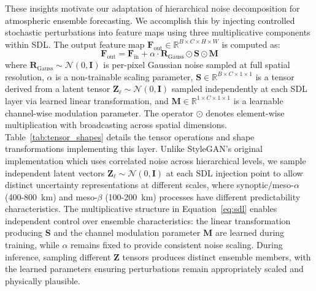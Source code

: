 \documentclass[11pt]{article}
\begin{document}
These insights motivate our adaptation of hierarchical noise decomposition for atmospheric ensemble forecasting. We accomplish this by injecting controlled stochastic perturbations into feature maps using three multiplicative components within SDL. The output feature map $\mathbf{F}_{\text{out}} \in \mathbb{R}^{B \times C \times H \times W}$ is computed as:
\begin{equation}
\mathbf{F}_{\text{out}} = \mathbf{F}_{\text{in}} + \alpha \cdot \mathbf{R}_{\text{Gauss}}  \odot \mathbf{S} \odot \mathbf{M}
\label{eq:sdl}
\end{equation}
where $\mathbf{R}_{\text{Gauss}} \sim \mathcal{N}(0, \mathbf{I})$ is per-pixel Gaussian noise sampled at full spatial resolution, $\alpha$ is a non-trainable scaling parameter, $\mathbf{S} \in \mathbb{R}^{B \times C \times 1 \times 1}$ is a tensor derived from a latent tensor $\mathbf{Z}_\ell \sim \mathcal{N}(0, \mathbf{I})$ sampled independently at each SDL layer via learned linear transformation, and $\mathbf{M} \in \mathbb{R}^{1 \times C \times 1 \times 1}$ is a learnable channel-wise modulation parameter. The operator $\odot$ denotes element-wise multiplication with broadcasting across spatial dimensions. Table~\ref{tab:tensor_shapes} details the tensor operations and shape transformations implementing this layer. Unlike StyleGAN's original implementation which uses correlated noise across hierarchical levels, we sample independent latent vectors $\mathbf{Z}_\ell \sim \mathcal{N}(0, \mathbf{I})$ at each SDL injection point to allow distinct uncertainty representations at different scales, where synoptic/meso-$\alpha$ (400-800~km) and meso-$\beta$ (100-200~km) processes have different predictability characteristics. The multiplicative structure in Equation~\ref{eq:sdl} enables independent control over ensemble characteristics: the linear transformation producing $\mathbf{S}$ and the channel modulation parameter $\mathbf{M}$ are learned during training, while $\alpha$ remains fixed to provide consistent noise scaling. During inference, sampling different $\mathbf{Z}$ tensors produces distinct ensemble members, with the learned parameters ensuring perturbations remain appropriately scaled and physically plausible.
\end{document}
